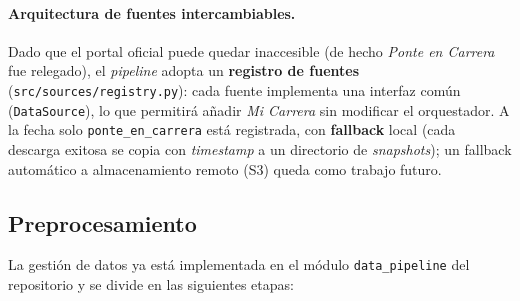 \paragraph{Arquitectura de fuentes intercambiables.} Dado que el portal oficial
puede quedar inaccesible (de hecho \emph{Ponte en Carrera} fue relegado), el
\emph{pipeline} adopta un \textbf{registro de fuentes}
(\texttt{src/sources/registry.py}): cada fuente implementa una interfaz com\'un
(\texttt{DataSource}), lo que permitir\'a a\~nadir \emph{Mi Carrera} sin
modificar el orquestador. A la fecha solo \texttt{ponte\_en\_carrera} est\'a
registrada, con \textbf{fallback} local (cada descarga exitosa se copia con
\emph{timestamp} a un directorio de \emph{snapshots}); un fallback autom\'atico
a almacenamiento remoto (S3) queda como trabajo futuro.

\subsection{Preprocesamiento}

La gesti\'on de datos ya est\'a implementada en el m\'odulo \texttt{data\_pipeline}
del repositorio y se divide en las siguientes etapas:

